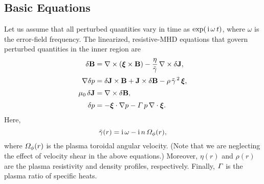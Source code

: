 \documentclass[12pt,prb,aps,notitlepage]{revtex4-1}
\newcommand {\bxi} {\mbox{\boldmath$\xi$}}
\begin{document}
\subsection{Basic Equations}
Let us assume that all perturbed quantities vary in time as $\exp(\,{\rm i}\,\omega\,t)$, where $\omega$ is the error-field frequency. The linearized, resistive-MHD equations
that govern perturbed quantities in the inner region are
\begin{align}\label{e212}
\delta{\bf B} &= \nabla\times(\bxi\times{\bf B}) - \frac{\eta}{\tilde{\gamma}}\,\nabla\times \delta{\bf J},\\[0.5ex]
\nabla\delta p &=\delta{\bf J}\times {\bf B}+ {\bf J}\times \delta{\bf B}-\rho\,\tilde{\gamma}^{\,2}\,\bxi,\\[0.5ex]
\mu_0\,\delta{\bf J} &=\nabla\times \delta{\bf B},\\[0.5ex]
\delta p& =-\bxi\cdot\nabla p-{\mit\Gamma}\,p\,\nabla\cdot\bxi.\label{e215}
\end{align}
Here,
\begin{equation}\label{e216}
\tilde{\gamma}(r) ={\rm i}\,\omega -{\rm i}\,n\,{\mit\Omega}_\phi(r),
\end{equation}
where ${\mit\Omega}_\phi(r)$ is the plasma toroidal angular velocity. (Note that we are neglecting the effect of
velocity shear in the above equations.) Moreover, $\eta(r)$ and $\rho(r)$ are the plasma resistivity and density
profiles, respectively.  Finally, ${\mit\Gamma}$ is the plasma ratio of specific heats. 
\end{document}
